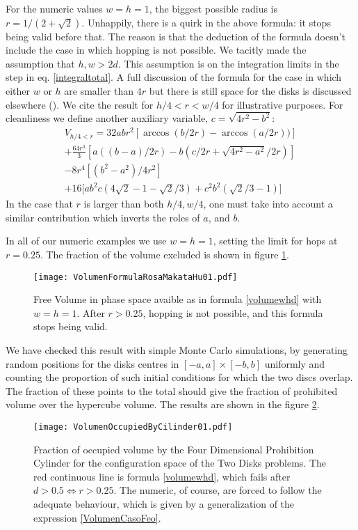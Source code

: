 \documentclass[a4paper,10pt, jcp, aps, preprint]{revtex4-1}
\begin{document}
For the numeric values $w=h=1$, the biggest possible radius is 
$r=1/(2+\sqrt{2})$. Unhappily, there is a quirk in the above formula:
it stops being valid before that. The reason is that the deduction
of the formula doesn't include the case in which hopping is not possible. 
We tacitly made the assumption that $h,w>2d$.  This assumption is on 
the integration limits in the step in eq. \ref{integraltotal}. 
A full discussion of the formula for the case in which either
$w$ or $h$ are smaller than $4r$ but there is still space for
the disks is discussed elsewhere \cite{notascalculokarel}(). 
We cite the  result for $h/4  <r< w/4$ for illustrative purposes.
For cleanliness we define another auxiliary variable,
$c=\sqrt{4r^2-b^2}$:
\begin{multline}\label{VolumenCasoFeo}
V_{h/4<r} = 32abr^2[\arccos(b/2r)-\arccos(a/2r))]\\
+\frac{64 r^3}{3 }[a((b-a)/2r)-b(c/2r+\sqrt{4r^2-a^2}/2r)]\\
-8r^4 [ (b^2-a^2)/4r^2]\\ 
+16[ a b^2 c (4\sqrt{2}-1-\sqrt{2}/3)
+c^2b^2 (\sqrt{2}/3-1) \big]
\end{multline}
In the case that $r$ is larger than both $h/4, w/4$, one must take
into account a similar
contribution which inverts the roles of $a$, and $b$.

In all of our numeric examples we use $w=h=1$, setting the
limit for hops at $r=0.25$. The fraction of the volume
excluded is shown in
figure  \ref{VolFRM}.

\begin{figure}[h]
\centering
\texttt{[image: VolumenFormulaRosaMakataHu01.pdf]}
\caption{Free Volume in phase space avaible as in formula \ref{volumewhd} 
with  $w=h=1$. After $r>0.25$, hopping is not possible, and this
formula stops being valid.}
\label{VolFRM}
\end{figure}

We have checked this result with simple Monte Carlo simulations, 
by generating random positions for the disks centres in 
$[-a,a] \times [-b,b]$ uniformly and 
counting the proportion of such initial conditions for 
which the two discs overlap. The fraction of these points to the 
total should give the fraction of prohibited volume over the hypercube
volume. The results are shown in the figure \ref{VolMonteC}.

\begin{figure}[h]
\centering
\texttt{[image: VolumenOccupiedByCilinder01.pdf]}
\caption{Fraction of occupied volume by the 
Four Dimensional Prohibition Cylinder for the configuration space of the 
Two Disks problems. The red continuous line is formula \ref{volumewhd}, 
which fails after $d>0.5\Leftrightarrow r>0.25$. The numeric,
of course, are forced to follow the adequate behaviour, which is given
by a generalization of the expression \ref{VolumenCasoFeo}. 
 }\label{VolMonteC}
\end{figure}
\end{document}
